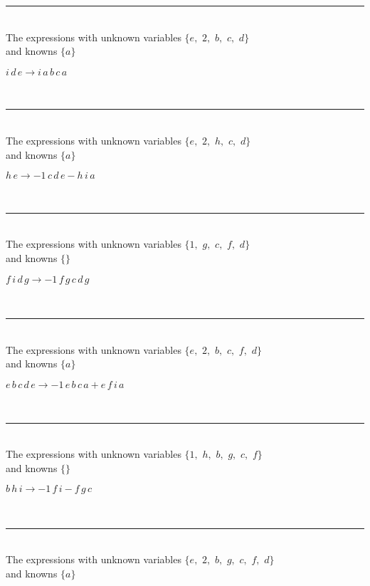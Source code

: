 \rule[3pt]{6in}{.7pt}\\
The expressions with unknown variables $\{e,
$ $
2,
$ $
b,
$ $
c,
$ $
d\}$\\
and knowns $\{a\}$\smallskip\\
\begin{minipage}{6in}
$
i\,
 d\,
 e\rightarrow i\,
 a\,
 b\,
 c\,
 a
$
\end{minipage}\\
\rule[3pt]{6in}{.7pt}\\
The expressions with unknown variables $\{e,
$ $
2,
$ $
h,
$ $
c,
$ $
d\}$\\
and knowns $\{a\}$\smallskip\\
\begin{minipage}{6in}
$
h\,
 e\rightarrow -1\,
 c\,
 d\,
 e - h\,
 i\,
 a
$
\end{minipage}\\
\rule[3pt]{6in}{.7pt}\\
The expressions with unknown variables $\{1,
$ $
g,
$ $
c,
$ $
f,
$ $
d\}$\\
and knowns $\{\}$\smallskip\\
\begin{minipage}{6in}
$
f\,
 i\,
 d\,
 g\rightarrow -1\,
 f\,
 g\,
 c\,
 d\,
 g
$
\end{minipage}\\
\rule[3pt]{6in}{.7pt}\\
The expressions with unknown variables $\{e,
$ $
2,
$ $
b,
$ $
c,
$ $
f,
$ $
d\}$\\
and knowns $\{a\}$\smallskip\\
\begin{minipage}{6in}
$
e\,
 b\,
 c\,
 d\,
 e\rightarrow -1\,
 e\,
 b\,
 c\,
 a + e\,
 f\,
 i\,
 a
$
\end{minipage}\\
\rule[3pt]{6in}{.7pt}\\
The expressions with unknown variables $\{1,
$ $
h,
$ $
b,
$ $
g,
$ $
c,
$ $
f\}$\\
and knowns $\{\}$\smallskip\\
\begin{minipage}{6in}
$
b\,
 h\,
 i\rightarrow -1\,
 f\,
 i - f\,
 g\,
 c
$
\end{minipage}\\
\rule[3pt]{6in}{.7pt}\\
The expressions with unknown variables $\{e,
$ $
2,
$ $
b,
$ $
g,
$ $
c,
$ $
f,
$ $
d\}$\\
and knowns $\{a\}$\smallskip\\
